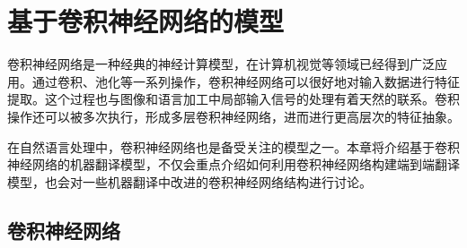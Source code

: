 
%


\renewcommand\figurename{图}%
\renewcommand\tablename{表}%
\newlength{\bcc}


\chapter{基于卷积神经网络的模型}

\parinterval 卷积神经网络是一种经典的神经计算模型，在计算机视觉等领域已经得到广泛应用。通过卷积、池化等一系列操作，卷积神经网络可以很好地对输入数据进行特征提取。这个过程也与图像和语言加工中局部输入信号的处理有着天然的联系。卷积操作还可以被多次执行，形成多层卷积神经网络，进而进行更高层次的特征抽象。

\parinterval 在自然语言处理中，卷积神经网络也是备受关注的模型之一。本章将介绍基于卷积神经网络的机器翻译模型，不仅会重点介绍如何利用卷积神经网络构建端到端翻译模型，也会对一些机器翻译中改进的卷积神经网络结构进行讨论。


\section{卷积神经网络}

